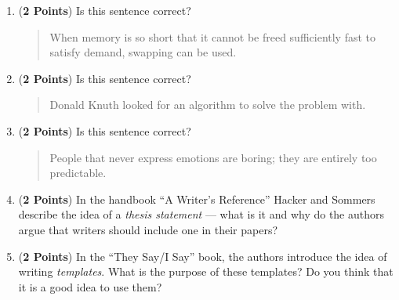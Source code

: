 \documentclass[12pt]{article}
\begin{document}
\begin{enumerate}
\begin{enumerate}

\item ({\bf 2 Points}) Is this sentence correct?

  \begin{quote}

    When memory is so short that it cannot be freed sufficiently fast
    to satisfy demand, swapping can be used.

  \end{quote}

\item ({\bf 2 Points}) Is this sentence correct?

  \begin{quote}

    Donald Knuth looked for an algorithm to solve the problem with.

  \end{quote}

\item ({\bf 2 Points}) Is this sentence correct?

  \begin{quote}

    People that never express emotions are boring; they are entirely
    too predictable.

  \end{quote}

\item ({\bf 2 Points}) In the handbook ``A Writer's Reference'' Hacker
  and Sommers describe the idea of a {\em thesis statement} --- what
  is it and why do the authors argue that writers should include one
  in their papers?

\item ({\bf 2 Points}) In the ``{They Say/I Say}'' book, the authors
  introduce the idea of writing {\em templates}.  What is the purpose
  of these templates?  Do you think that it is a good idea to use
  them?

\end{enumerate}

\end{enumerate}
\end{document}
